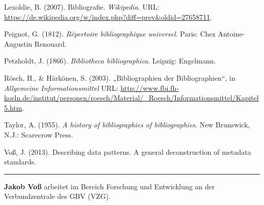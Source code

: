 \documentclass[a4paper,
fontsize=11pt,
oneside,
numbers=noperiodatend,
parskip=half-,
bibliography=totoc,
final
]{scrartcl}
\begin{document}
Lexoldie, B. (2007). Bibliografie. \emph{Wikipedia}. URL:
\url{https://de.wikipedia.org/w/index.php?diff=prev\&oldid=27658711}.

Peignot, G. (1812). \emph{Répertoire bibliographique universel}. Paris:
Chez Antoine-Augustin Renouard.

Petzholdt, J. (1866). \emph{Bibliotheca bibliographica}. Leipzig:
Engelmann.

Rösch, H., \& Härkönen, S. (2003). „Bibliographien der Bibliographien``,
in \emph{Allgemeine Informationsmittel} URL:
\url{http://www.fbi.fh-koeln.de/institut/personen/roesch/Material/_Roesch/Informationsmittel/Kapitel5.htm}.

Taylor, A. (1955). \emph{A history of bibliographies of bibliographies}.
New Brunswick, N.J.: Scarecrow Press.

Voß, J. (2013). Describing data patterns. A general deconstruction of
metadata standards.

\begin{center}\rule{0.5\linewidth}{\linethickness}\end{center}

\textbf{Jakob Voß} arbeitet im Bereich Forschung und Entwicklung an der
Verbundzentrale des GBV (VZG).
\end{document}
